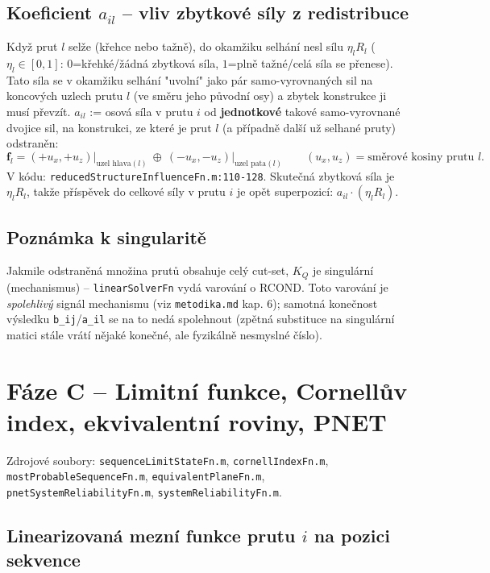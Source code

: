 \documentclass[11pt,a4paper]{article}
\newcommand{\code}[1]{\texttt{#1}}
\begin{document}
\subsection{Koeficient $a_{il}$ -- vliv zbytkové síly z redistribuce}

Když prut $l$ selže (křehce nebo tažně), do okamžiku selhání nesl sílu $\eta_l R_l$ ($\eta_l\in[0,1]$:
$0$=křehké/žádná zbytková síla, $1$=plně tažné/celá síla se přenese). Tato síla se v okamžiku selhání
"uvolní" jako pár samo-vyrovnaných sil na koncových uzlech prutu $l$ (ve směru jeho původní osy) a
zbytek konstrukce ji musí převzít. $a_{il}$ := osová síla v prutu $i$ od \textbf{jednotkové} takové
samo-vyrovnané dvojice sil, na konstrukci, ze které je prut $l$ (a případně další už selhané pruty)
odstraněn:
\[
  \mathbf f_l = (+u_x,+u_z)\big|_{\text{uzel hlava}(l)} \ \oplus\ (-u_x,-u_z)\big|_{\text{uzel pata}(l)}
  \qquad (u_x,u_z)=\text{směrové kosiny prutu } l.
\]
V kódu: \code{reducedStructureInfluenceFn.m:110-128}. Skutečná zbytková síla je $\eta_l R_l$, takže
příspěvek do celkové síly v prutu $i$ je opět superpozicí: $a_{il}\cdot(\eta_l R_l)$.

\subsection{Poznámka k singularitě}

Jakmile odstraněná množina prutů obsahuje celý cut-set, $K_Q$ je singulární (mechanismus) --
\code{linearSolverFn} vydá varování o RCOND. Toto varování je \emph{spolehlivý} signál mechanismu
(viz \code{metodika.md} kap. 6); samotná konečnost výsledku \code{b\_ij}/\code{a\_il} se na to
nedá spolehnout (zpětná substituce na singulární matici stále vrátí nějaké konečné, ale fyzikálně
nesmyslné číslo).

\section{Fáze C -- Limitní funkce, Cornellův index, ekvivalentní roviny, PNET}
\label{sec:faze-c}

Zdrojové soubory: \code{sequenceLimitStateFn.m}, \code{cornellIndexFn.m},
\code{mostProbableSequenceFn.m}, \code{equivalentPlaneFn.m}, \code{pnetSystemReliabilityFn.m},
\code{systemReliabilityFn.m}.

\subsection{Linearizovaná mezní funkce prutu $i$ na pozici sekvence}
\label{sec:c1}
\end{document}
